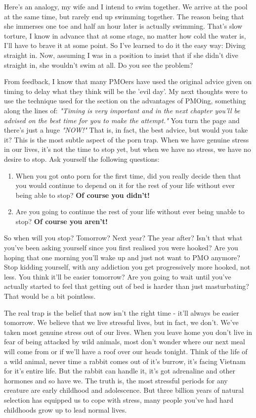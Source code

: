 \documentclass[easypeasy.tex]{subfiles}
\begin{document}
Here's an analogy, my wife and I intend to swim together. We arrive at the pool at the same time, but rarely end up swimming together. The reason being that she immerses one toe and half an hour later is actually swimming. That's slow torture, I know in advance that at some stage, no matter how cold the water is, I'll have to brave it at some point. So I've learned to do it the easy way: Diving straight in. Now, assuming I was in a position to insist that if she didn't dive straight in, she wouldn't swim at all. Do you see the problem?

From feedback, I know that many PMOers have used the original advice given on timing to delay what they think will be the 'evil day'. My next thoughts were to use the technique used for the section on the advantages of PMOing, something along the lines of: \textit{"Timing is very important and in the next chapter you'll be advised on the best time for you to make the attempt."} You turn the page and there's just a huge \textit{"NOW!"} That is, in fact, the best advice, but would you take it? This is the most subtle aspect of the porn trap. When we have genuine stress in our lives, it's not the time to stop yet, but when we have no stress, we have no desire to stop. Ask yourself the following questions:

\begin{enumerate}
  \item When you got onto porn for the first time, did you really decide then that you would continue to depend on it for the rest of your life without ever being able to stop? \textbf{Of course you didn't!}

  \item Are you going to continue the rest of your life without ever being unable to stop? \textbf{Of course you aren't!}
  \end{enumerate}

So when will you stop? Tomorrow? Next year? The year after? Isn't that what you've been asking yourself since you first realised you were hooked? Are you hoping that one morning you'll wake up and just not want to PMO anymore? Stop kidding yourself, with any addiction you get progressively more hooked, not less. You think it'll be easier tomorrow? Are you going to wait until you've actually started to feel that getting out of bed is harder than just masturbating? That would be a bit pointless.

The real trap is the belief that now isn't the right time - it'll always be easier tomorrow. We believe that we live stressful lives, but in fact, we don't. We've taken most genuine stress out of our lives. When you leave home you don't live in fear of being attacked by wild animals, most don't wonder where our next meal will come from or if we'll have a roof over our heads tonight. Think of the life of a wild animal, never time a rabbit comes out of it's burrow, it's facing Vietnam for it's entire life. But the rabbit can handle it, it's got adrenaline and other hormones and so have we. The truth is, the most stressful periods for any creature are early childhood and adolescence. But three billion years of natural selection has equipped us to cope with stress, many people you've had hard childhoods grow up to lead normal lives.
\end{document}
